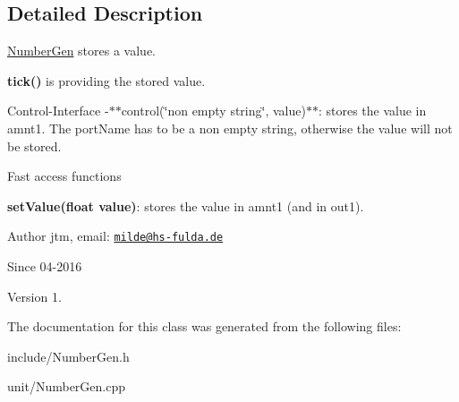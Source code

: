 \subsection{Detailed Description}
\hyperlink{classunit_1_1NumberGen}{Number\-Gen} stores a value.


\begin{DoxyItemize}
\item {\bfseries tick()} is providing the stored value.
\end{DoxyItemize}

Control-\/\-Interface -\/$\ast$$\ast$control(\char`\"{}non empty string\char`\"{}, value)$\ast$$\ast$\-: stores the value in amnt1. The port\-Name has to be a non empty string, otherwise the value will not be stored.

Fast access functions
\begin{DoxyItemize}
\item {\bfseries set\-Value(float value)}\-: stores the value in amnt1 (and in out1).
\end{DoxyItemize}

\begin{DoxyAuthor}{Author}
jtm, email\-:  \href{mailto:milde@hs-fulda.de}{\tt milde@hs-\/fulda.\-de} 
\end{DoxyAuthor}
\begin{DoxySince}{Since}
04-\/2016 
\end{DoxySince}
\begin{DoxyVersion}{Version}
1. 
\end{DoxyVersion}


The documentation for this class was generated from the following files\-:\begin{DoxyCompactItemize}
\item 
include/Number\-Gen.\-h\item 
unit/Number\-Gen.\-cpp\end{DoxyCompactItemize}
